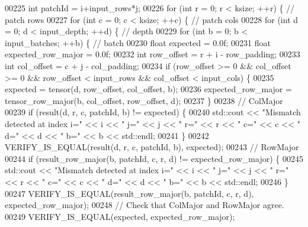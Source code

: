 \begin{DoxyCode}
00225       \textcolor{keywordtype}{int} patchId = i+input\_rows*j;
00226       \textcolor{keywordflow}{for} (\textcolor{keywordtype}{int} r = 0; r < ksize; ++r) \{  \textcolor{comment}{// patch rows}
00227         \textcolor{keywordflow}{for} (\textcolor{keywordtype}{int} c = 0; c < ksize; ++c) \{  \textcolor{comment}{// patch cols}
00228           \textcolor{keywordflow}{for} (\textcolor{keywordtype}{int} d = 0; d < input\_depth; ++d) \{  \textcolor{comment}{// depth}
00229             \textcolor{keywordflow}{for} (\textcolor{keywordtype}{int} b = 0; b < input\_batches; ++b) \{  \textcolor{comment}{// batch}
00230               \textcolor{keywordtype}{float} expected = 0.0f;
00231               \textcolor{keywordtype}{float} expected\_row\_major = 0.0f;
00232               \textcolor{keywordtype}{int} row\_offset = r + i - row\_padding;
00233               \textcolor{keywordtype}{int} col\_offset = c + j - col\_padding;
00234               \textcolor{keywordflow}{if} (row\_offset >= 0 && col\_offset >= 0 && row\_offset < input\_rows && col\_offset < input\_cols)
       \{
00235                 expected = tensor(d, row\_offset, col\_offset, b);
00236                 expected\_row\_major = tensor\_row\_major(b, col\_offset, row\_offset, d);
00237               \}
00238               \textcolor{comment}{// ColMajor}
00239               \textcolor{keywordflow}{if} (result(d, r, c, patchId, b) != expected) \{
00240                 std::cout << \textcolor{stringliteral}{"Mismatch detected at index i="} << i << \textcolor{stringliteral}{" j="} << j << \textcolor{stringliteral}{" r="} << r << \textcolor{stringliteral}{" c="} << c
       << \textcolor{stringliteral}{" d="} << d << \textcolor{stringliteral}{" b="} << b << std::endl;
00241               \}
00242               VERIFY\_IS\_EQUAL(result(d, r, c, patchId, b), expected);
00243               \textcolor{comment}{// RowMajor}
00244               \textcolor{keywordflow}{if} (result\_row\_major(b, patchId, c, r, d) != expected\_row\_major) \{
00245                 std::cout << \textcolor{stringliteral}{"Mismatch detected at index i="} << i << \textcolor{stringliteral}{" j="} << j << \textcolor{stringliteral}{" r="} << r << \textcolor{stringliteral}{" c="} << c
       << \textcolor{stringliteral}{" d="} << d << \textcolor{stringliteral}{" b="} << b << std::endl;
00246               \}
00247               VERIFY\_IS\_EQUAL(result\_row\_major(b, patchId, c, r, d), expected\_row\_major);
00248               \textcolor{comment}{// Check that ColMajor and RowMajor agree.}
00249               VERIFY\_IS\_EQUAL(expected, expected\_row\_major);

\end{DoxyCode}
